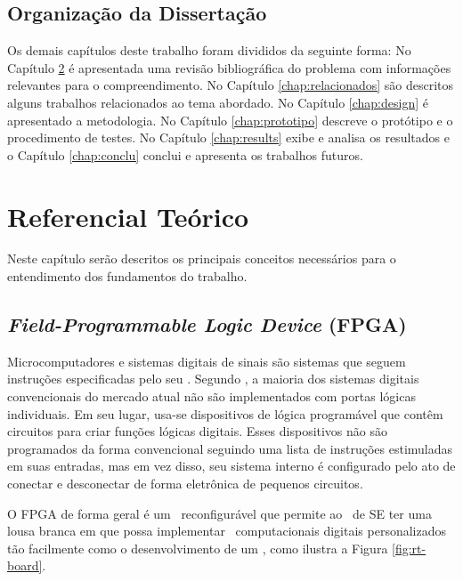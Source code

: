     \section{Organização da Dissertação}
        Os demais capítulos deste trabalho foram divididos da seguinte forma: 
        No Capítulo \ref{chap:revisao_bibliografica} é apresentada uma revisão bibliográfica do problema com informações relevantes para o compreendimento. 
        No Capítulo \ref{chap:relacionados} são descritos alguns trabalhos relacionados ao tema abordado. 
        No Capítulo \ref{chap:design} é apresentado a metodologia. 
        No Capítulo \ref{chap:prototipo} descreve o protótipo e o procedimento de testes.
        No Capítulo \ref{chap:results} exibe e analisa os resultados e o Capítulo \ref{chap:conclu} conclui e apresenta os trabalhos futuros.








\chapter{Referencial Teórico} \label{chap:revisao_bibliografica}

Neste capítulo serão descritos os principais conceitos necessários para o entendimento dos fundamentos do trabalho.%


\section{\textit{Field-Programmable Logic Device} (FPGA)}

    Microcomputadores e sistemas digitais de sinais são sistemas que seguem instruções especificadas pelo seu \design.
    Segundo \citet{tocci2003sistemas}, a maioria dos sistemas digitais convencionais do mercado atual não são implementados com portas lógicas individuais.
    Em seu lugar, usa-se dispositivos de lógica programável que contêm circuitos para criar funções lógicas digitais.
    Esses dispositivos não são programados da forma convencional seguindo uma lista de instruções estimuladas em suas entradas, mas em vez disso, seu sistema interno é configurado pelo ato de conectar e desconectar de forma eletrônica de pequenos circuitos.

	O FPGA de forma geral é um \hardware\ reconfigurável que permite ao \designer\ de SE ter uma lousa branca em que possa implementar \hardwares\ computacionais digitais personalizados tão facilmente como o desenvolvimento de um \software, como ilustra a Figura \ref{fig:rt-board}.
    
